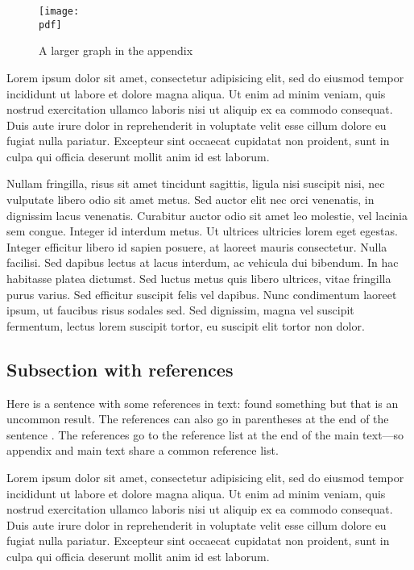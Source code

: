 \documentclass[letterpaper,11pt,leqno]{article}
\newcommand{\pdf}{figures.pdf}
\begin{document}
\begin{figure}[t]
\texttt{[image: \\pdf]}
\caption{A larger graph in the appendix}
\label{f:appendix1}\end{figure}

Lorem ipsum dolor sit amet, consectetur adipisicing elit, sed do eiusmod
tempor incididunt ut labore et dolore magna aliqua. Ut enim ad minim veniam,
quis nostrud exercitation ullamco laboris nisi ut aliquip ex ea commodo
consequat. Duis aute irure dolor in reprehenderit in voluptate velit esse
cillum dolore eu fugiat nulla pariatur. Excepteur sint occaecat cupidatat non
proident, sunt in culpa qui officia deserunt mollit anim id est laborum.

Nullam fringilla, risus sit amet tincidunt sagittis, ligula nisi suscipit nisi, nec vulputate libero odio sit amet metus. Sed auctor elit nec orci venenatis, in dignissim lacus venenatis. Curabitur auctor odio sit amet leo molestie, vel lacinia sem congue. Integer id interdum metus. Ut ultrices ultricies lorem eget egestas. Integer efficitur libero id sapien posuere, at laoreet mauris consectetur. Nulla facilisi. Sed dapibus lectus at lacus interdum, ac vehicula dui bibendum. In hac habitasse platea dictumst. Sed luctus metus quis libero ultrices, vitae fringilla purus varius. Sed efficitur suscipit felis vel dapibus. Nunc condimentum laoreet ipsum, ut faucibus risus sodales sed. Sed dignissim, magna vel suscipit fermentum, lectus lorem suscipit tortor, eu suscipit elit tortor non dolor. 

\subsection{Subsection with references}\label{a:subappendix}

Here is a sentence with some references in text: \citet{MS19,MS21b} found something but that is an uncommon result. The references can also go in parentheses at the end of the sentence \citep{MS24,MS21a}. The references go to the reference list at the end of the main text---so appendix and main text share a common reference list.

Lorem ipsum dolor sit amet, consectetur adipisicing elit, sed do eiusmod
tempor incididunt ut labore et dolore magna aliqua. Ut enim ad minim veniam,
quis nostrud exercitation ullamco laboris nisi ut aliquip ex ea commodo
consequat. Duis aute irure dolor in reprehenderit in voluptate velit esse
cillum dolore eu fugiat nulla pariatur. Excepteur sint occaecat cupidatat non
proident, sunt in culpa qui officia deserunt mollit anim id est laborum.
\end{document}
